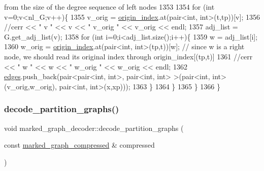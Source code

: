 \begin{DoxyCode}
{       from the size of the degree sequence of left nodes}
1353     
1354     \textcolor{keywordflow}{for} (\textcolor{keywordtype}{int} v=0;v<nl\_G;v++)\{
1355       v\_orig = \hyperlink{classmarked__graph__decoder_aab3e2f6d4376ba96da32f25aa9ddd069}{origin\_index}.at(pair<int, int>(t,tp))[v];
1356       \textcolor{comment}{//cerr << " v " << v << " v\_orig " << v\_orig << endl;}
1357       adj\_list = G.get\_adj\_list(v);
1358       \textcolor{keywordflow}{for} (\textcolor{keywordtype}{int} i=0;i<adj\_list.size();i++)\{
1359         w = adj\_list[i];
1360         w\_orig = \hyperlink{classmarked__graph__decoder_aab3e2f6d4376ba96da32f25aa9ddd069}{origin\_index}.at(pair<int, int>(tp,t))[w]; \textcolor{comment}{// since w is a right node, we
       should read its original index through origin\_index[(tp,t)]}
1361         \textcolor{comment}{//cerr << " w " << w << " w\_orig " << w\_orig << endl;}
1362         \hyperlink{classmarked__graph__decoder_af9e75da0a495d9c3bdcd169e15e3261e}{edges}.push\_back(pair<pair<int, int>, pair<int, int> >(pair<int, int>(v\_orig,w\_orig), pair<int,
       int>(x,xp)));
1363       \}
1364     \}
1365   \}
1366 \}
\end{DoxyCode}
\mbox{\label{classmarked__graph__decoder_a80eb5f68b45ba160b9a00334476b6be7}} 
\subsubsection{\texorpdfstring{decode\+\_\+partition\+\_\+graphs()}{decode\_partition\_graphs()}}
{\footnotesize\ttfamily void marked\+\_\+graph\+\_\+decoder\+::decode\+\_\+partition\+\_\+graphs (\begin{DoxyParamCaption}\item[{const \hyperlink{classmarked__graph__compressed}{marked\+\_\+graph\+\_\+compressed} \&}]{compressed }\end{DoxyParamCaption})\hspace{0.3cm}{\ttfamily [private]}}


